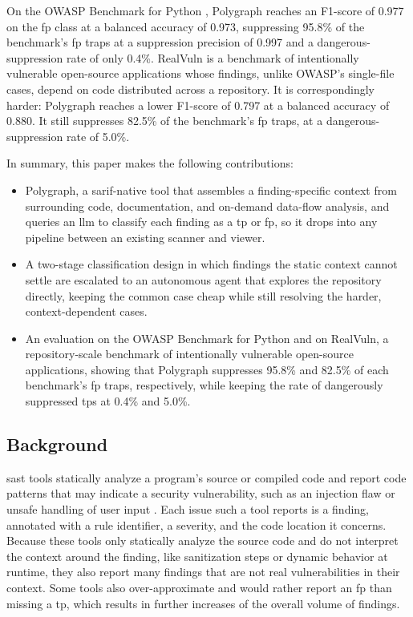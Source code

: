 On the OWASP Benchmark for Python \cite{owaspbenchmark}, Polygraph reaches an
F1-score of 0.977 on the \ac{fp} class at a balanced accuracy of
0.973, suppressing 95.8\% of the benchmark's \ac{fp} traps at a
suppression precision of 0.997 and a dangerous-suppression rate of only
0.4\%. RealVuln \cite{realvuln} is a benchmark of intentionally vulnerable
open-source applications whose findings, unlike OWASP's single-file cases,
depend on code distributed across a repository. It is correspondingly
harder: Polygraph reaches a lower F1-score of 0.797 at a balanced accuracy of
0.880. It still suppresses 82.5\% of the benchmark's \ac{fp} traps,
at a dangerous-suppression rate of 5.0\%.

In summary, this paper makes the following contributions:
\begin{itemize}
    \item Polygraph, a \ac{sarif}-native tool that assembles a finding-specific context from surrounding code, documentation, and on-demand data-flow analysis, and queries an \ac{llm} to classify each finding as a \ac{tp} or \ac{fp}, so it drops into any pipeline between an existing scanner and viewer.
    \item A two-stage classification design in which findings the static context cannot settle are escalated to an autonomous agent that explores the repository directly, keeping the common case cheap while still resolving the harder, context-dependent cases.
    \item An evaluation on the OWASP Benchmark for Python and on RealVuln, a repository-scale benchmark of intentionally vulnerable open-source applications, showing that Polygraph suppresses 95.8\% and 82.5\% of each benchmark's \ac{fp} traps, respectively, while keeping the rate of dangerously suppressed \acp{tp} at 0.4\% and 5.0\%.
\end{itemize}

\subsection{Background}

\ac{sast} tools statically analyze a program's source or compiled code and
report code patterns that may indicate a security vulnerability, such as an
injection flaw or unsafe handling of user input \cite{chess2004static}. Each
issue such a tool reports is a finding, annotated with a rule identifier, a
severity, and the code location it concerns. Because these tools only statically
analyze the source code and do not interpret the context around the finding, like sanitization steps or dynamic behavior at runtime, they also report many findings that are not real vulnerabilities in their context.
Some tools also over-approximate and would rather report an \ac{fp} than missing a \ac{tp}, which results in further increases of the overall volume of findings.

